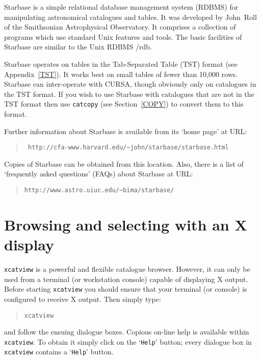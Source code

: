 \documentclass[twoside,11pt]{article}
\newcommand{\htmladdnormallink}[2]{#1}
\newcommand{\xlabel}[1]{}
\renewcommand{\_}{\texttt{\symbol{95}}}
\begin{document}
Starbase is a simple relational database management system (RDBMS)
for manipulating astronomical catalogues and tables.  It was developed
by John~Roll of the Smithsonian Astrophysical Observatory.  It comprises
a collection of programs which use standard Unix features and tools.  The
basic facilities of Starbase are similar to the Unix RDBMS /rdb.

Starbase operates on tables in the Tab-Separated Table (TST) format
(see Appendix~\ref{TST}).  It works best on small tables of fewer than
10,000 rows.  Starbase can inter-operate with CURSA, though obviously
only on catalogues in the TST format.  If you wish to use Starbase with
catalogues that are not in the TST format then use {\tt catcopy} (see
Section~\ref{COPY}) to convert them to this format.

Further information about Starbase is available from its `home page'
at URL:

\begin{quote}
\htmladdnormallink{{\tt 
http://cfa-www.harvard.edu/\~{}john/starbase/starbase.html}}
{http://cfa-www.harvard.edu/\~{}john/starbase/starbase.html}
\end{quote}

Copies of Starbase can be obtained from this location.  Also, there is a
list of `frequently asked questions' (FAQs) about Starbase at URL:

\begin{quote}
\htmladdnormallink{{\tt http://www.astro.uiuc.edu/\~{}bima/starbase/}}
{http://www.astro.uiuc.edu/\~{}bima/starbase/}
\end{quote}


\section{\xlabel{XVIEW}\label{XVIEW}Browsing and selecting with an X display}

{\tt xcatview} is a powerful and flexible catalogue browser. However,
it can only be used from a terminal (or workstation console) capable
of displaying X output. Before starting {\tt xcatview} you should ensure
that your terminal (or console) is configured to receive X output. Then
simply type:

\begin{verse}
{\tt xcatview}
\end{verse}

and follow the ensuing dialogue boxes. Copious on-line help is available
within {\tt xcatview}. To obtain it simply click on the `{\tt Help}'
button; every dialogue box in {\tt xcatview} contains a `{\tt Help}'
button.
\end{document}
